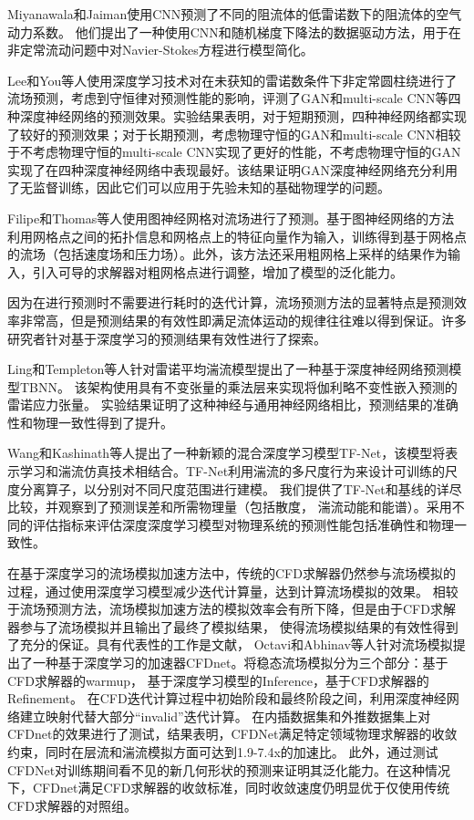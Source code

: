 Miyanawala和Jaiman\cite{2017An}使用CNN预测了不同的阻流体的低雷诺数下的阻流体的空气动力系数。 他们提出了一种使用CNN和随机梯度下降法的数据驱动方法，用于在非定常流动问题中对Navier-Stokes方程进行模型简化。

Lee和You等人\cite{lee2019data}使用深度学习技术对在未获知的雷诺数条件下非定常圆柱绕进行了流场预测，考虑到守恒律对预测性能的影响，评测了GAN和multi-scale CNN等四种深度神经网络的预测效果。实验结果表明，对于短期预测，四种神经网络都实现了较好的预测效果；对于长期预测，考虑物理守恒的GAN和multi-scale CNN相较于不考虑物理守恒的multi-scale CNN实现了更好的性能，不考虑物理守恒的GAN实现了在四种深度神经网络中表现最好。该结果证明GAN深度神经网络充分利用了无监督训练，因此它们可以应用于先验未知的基础物理学的问题。

Filipe和Thomas等人\cite{2020Combining}使用图神经网格对流场进行了预测。基于图神经网络的方法利用网格点之间的拓扑信息和网格点上的特征向量作为输入，训练得到基于网格点的流场（包括速度场和压力场）。此外，该方法还采用粗网格上采样的结果作为输入，引入可导的求解器对粗网格点进行调整，增加了模型的泛化能力。

因为在进行预测时不需要进行耗时的迭代计算，流场预测方法的显著特点是预测效率非常高，但是预测结果的有效性即满足流体运动的规律往往难以得到保证。许多研究者针对基于深度学习的预测结果有效性进行了探索。

Ling和Templeton等人\cite{invariance}针对雷诺平均湍流模型提出了一种基于深度神经网络预测模型TBNN。
该架构使用具有不变张量的乘法层来实现将伽利略不变性嵌入预测的雷诺应力张量。 
实验结果证明了这种神经与通用神经网络相比，预测结果的准确性和物理一致性得到了提升。

Wang和Kashinath\cite{DBLP:journals/nips2019}等人提出了一种新颖的混合深度学习模型TF-Net，该模型将表示学习和湍流仿真技术相结合。TF-Net利用湍流的多尺度行为来设计可训练的尺度分离算子，以分别对不同尺度范围进行建模。 我们提供了TF-Net和基线的详尽比较，并观察到了预测误差和所需物理量（包括散度，
湍流动能和能谱）。采用不同的评估指标来评估深度深度学习模型对物理系统的预测性能包括准确性和物理一致性。


在基于深度学习的流场模拟加速方法中，传统的CFD求解器仍然参与流场模拟的过程，通过使用深度学习模型减少迭代计算量，达到计算流场模拟的效果。
相较于流场预测方法，流场模拟加速方法的模拟效率会有所下降，但是由于CFD求解器参与了流场模拟并且输出了最终了模拟结果，
使得流场模拟结果的有效性得到了充分的保证。具有代表性的工作是文献\cite{cfdnet}，
Octavi和Abhinav等人针对流场模拟提出了一种基于深度学习的加速器CFDnet。将稳态流场模拟分为三个部分：基于CFD求解器的warmup，
基于深度学习模型的Inference，基于CFD求解器的Refinement。
在CFD迭代计算过程中初始阶段和最终阶段之间，利用深度神经网络建立映射代替大部分“invalid”迭代计算。
在内插数据集和外推数据集上对CFDnet的效果进行了测试，结果表明，CFDNet满足特定领域物理求解器的收敛约束，同时在层流和湍流模拟方面可达到1.9-7.4x的加速比。 此外，通过测试CFDNet对训练期间看不见的新几何形状的预测来证明其泛化能力。在这种情况下，CFDnet满足CFD求解器的收敛标准，同时收敛速度仍明显优于仅使用传统CFD求解器的对照组。


